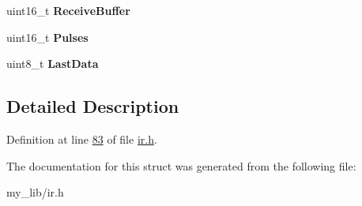 \begin{DoxyCompactItemize}
\item 
\hypertarget{struct_i_r_instance_aba9722c0b3b4643583f06d05d23bc54d}{uint16\-\_\-t {\bfseries Receive\-Buffer}}\label{struct_i_r_instance_aba9722c0b3b4643583f06d05d23bc54d}

\item 
\hypertarget{struct_i_r_instance_a374091556baaf95cb29a195e877efc1c}{uint16\-\_\-t {\bfseries Pulses}}\label{struct_i_r_instance_a374091556baaf95cb29a195e877efc1c}

\item 
\hypertarget{struct_i_r_instance_a5d62b35c44888dcb86452195478269fe}{uint8\-\_\-t {\bfseries Last\-Data}}\label{struct_i_r_instance_a5d62b35c44888dcb86452195478269fe}

\end{DoxyCompactItemize}


\subsection{Detailed Description}


Definition at line \hyperlink{ir_8h_source_l00083}{83} of file \hyperlink{ir_8h_source}{ir.\-h}.



The documentation for this struct was generated from the following file\-:\begin{DoxyCompactItemize}
\item 
my\-\_\-lib/ir.\-h\end{DoxyCompactItemize}
